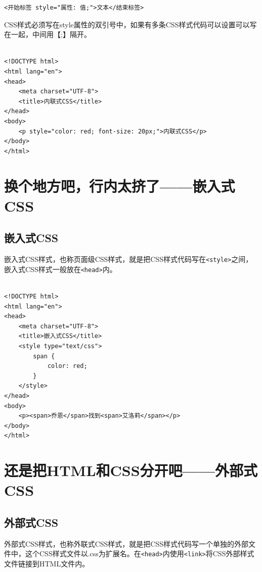 \begin{lstlisting}[style=htmlcssjs]
<开始标签 style="属性: 值;">文本</结束标签>
\end{lstlisting}

CSS样式必须写在style属性的双引号中，如果有多条CSS样式代码可以设置可以写在一起，中间用【;】隔开。 \\

 \\
\begin{lstlisting}[style=htmlcssjs]
<!DOCTYPE html>
<html lang="en">
<head>
    <meta charset="UTF-8">
    <title>内联式CSS</title>
</head>
<body>
    <p style="color: red; font-size: 20px;">内联式CSS</p>
</body>
</html>
\end{lstlisting}

\newpage

\section{换个地方吧，行内太挤了——嵌入式CSS}

\subsection{嵌入式CSS}

嵌入式CSS样式，也称页面级CSS样式，就是把CSS样式代码写在\lstinline|<style>|之间，嵌入式CSS样式一般放在\lstinline|<head>|内。 \\

 \\
\begin{lstlisting}[style=htmlcssjs]
<!DOCTYPE html>
<html lang="en">
<head>
    <meta charset="UTF-8">
    <title>嵌入式CSS</title>
    <style type="text/css">
        span {
            color: red;
        }
    </style>
</head>
<body>
    <p><span>乔恩</span>找到<span>艾洛莉</span></p>
</body>
</html>
\end{lstlisting}

\newpage

\section{还是把HTML和CSS分开吧——外部式CSS}

\subsection{外部式CSS}

外部式CSS样式，也称外联式CSS样式，就是把CSS样式代码写一个单独的外部文件中，这个CSS样式文件以.css为扩展名。在\lstinline|<head>|内使用\lstinline|<link>|将CSS外部样式文件链接到HTML文件内。 \\

